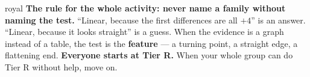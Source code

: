 \documentclass[10pt]{article}
\begin{document}

\vspace{0.15in}

\begin{scenariobox}{royal}
\small
\textbf{The rule for the whole activity: never name a family without naming the test.} ``Linear,
because the first differences are all $+4$'' is an answer. ``Linear, because it looks straight'' is a
guess. When the evidence is a graph instead of a table, the test is the \textbf{feature} --- a
turning point, a straight edge, a flattening end. \textbf{Everyone starts at Tier R.} When your whole
group can do Tier R without help, move on.
\end{scenariobox}

\vspace{0.10in}
\end{document}
